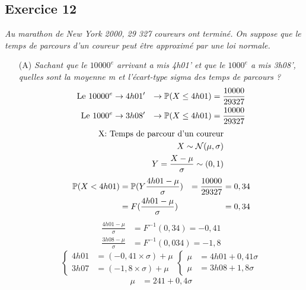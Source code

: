 \subsection*{Exercice 12}
\textit{Au marathon de New York 2000, 29 327 coureurs ont terminé. On suppose que le temps de parcours d’un coureur peut être approximé par une loi normale.}
\begin{itemize}
    \item[(A)]  \textit{ Sachant que le $10 000^e$ arrivant a mis 4h01’ et que le $1000^e$ a mis 3h08’, quelles sont la moyenne m et l’écart-type sigma des temps de parcours ?}\\
    \begin{align*}
        \text{Le } 10000^e &\rightarrow 4h01'&\rightarrow \mathbb{P}(X \leq 4h01) = \frac{10000}{29327}\\
        \text{Le } 1000^e &\rightarrow 3h08'&\rightarrow \mathbb{P}(X \leq 4h01) = \frac{10000}{29327}
    \end{align*}
    \begin{align*}
        \text{X: Temps de parcour d'un coureur}\\
        X \sim \mathcal{N}(\mu,\sigma)\\
        Y = \frac{X - \mu}{\sigma} \sim (0,1)
    \end{align*}
    \begin{align*}
        \mathbb{P}(X < 4h01) &= \mathbb{P}(Y \frac{4h01 - \mu}{\sigma}) &=\frac{10000}{29327} &= 0,34\\
        &= F(\frac{4h01 - \mu}{\sigma}) &&= 0,34
    \end{align*}
    \begin{align*}
        \frac{4h01 - \mu}{\sigma} &= F^{-1}(0,34) = -0,41\\
        \frac{3h08 - \mu}{\sigma} &= F^{-1}(0,034) = -1,8
    \end{align*}
    \begin{displaymath}
    \left\{ \begin{array}{ll}
    4h01 &= (-0,41 \times \sigma) + \mu\\
    3h07 &= (-1,8 \times \sigma) + \mu
    \end{array} \right.
    \left\{ \begin{array}{ll}
    \mu &= 4h01 + 0,41\sigma\\
    \mu &= 3h08 +1,8\sigma
    \end{array} \right.
    \end{displaymath}
    \begin{align*}
        \mu &= 241 + 0,4 \sigma\\

\end{align*}
\end{itemize}
